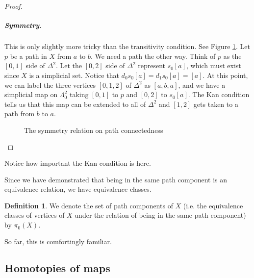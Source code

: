 \documentclass[12pt]{article}
\theoremstyle{plain}
\theoremstyle{definition}
\newtheorem{definition}[theorem]{Definition}
\begin{document}
\begin{proof}
\subparagraph{Symmetry.} This is only slightly more tricky than the transitivity condition.  See Figure \ref{F: fig20b}. Let $p$ be a path in $X$ from $a$ to $b$. We need a path the other way. Think of $p$ as the $[0,1]$ side of $\Delta^2$. Let the $[0,2]$ side of $\Delta^2$ represent $s_0[a]$, which must exist since $X$ is a simplicial set. Notice that $d_0s_0[a]=d_1s_0[a]=[a]$. At this point, we can label the three vertices $[0,1,2]$ of $\Delta^2$ as $[a,b,a]$, and we have a simplicial map on $\Lambda^2_0$ taking $[0,1]$ to $p$ and $[0,2]$ to $s_0[a]$. The Kan condition tells us that this map can be extended to all of $\Delta^2$ and $[1,2]$ gets taken to a path from $b$ to $a$. 
\begin{figure}[!htp]
\begin{center}
\end{center}
\caption{The symmetry relation on path connectedness}\label{F: fig20b}
\end{figure}
\end{proof}

Notice how important the Kan condition is here. 

Since we have demonstrated that being in the same path component is an equivalence relation, we have equivalence classes.

\begin{definition}
We denote the set of path components of $X$ (i.e. the equivalence classes of vertices of $X$ under the relation of being in the same path component) by  $\pi_0(X)$.
\end{definition}


So far, this is comfortingly familiar.







\subsection{Homotopies of maps}\label{S: homotopy}
\end{document}
